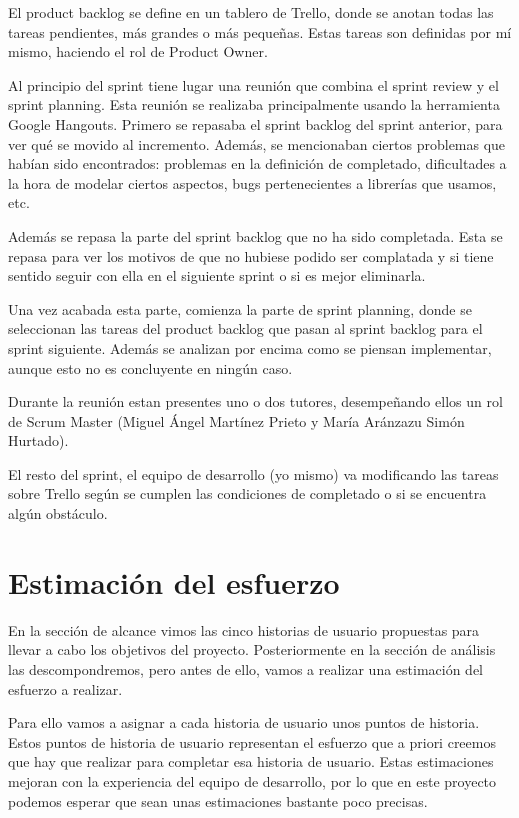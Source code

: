 \documentclass[12pt]{report} %
\begin{document}
El product backlog se define en un tablero de Trello, donde se anotan todas las tareas pendientes, más grandes o más pequeñas. Estas tareas son definidas por mí mismo, haciendo el rol de Product Owner.

Al principio del sprint tiene lugar una reunión que combina el sprint review y el sprint planning. Esta reunión se realizaba principalmente usando la herramienta Google Hangouts. Primero se repasaba el sprint backlog del sprint anterior, para ver qué se movido al incremento. Además, se mencionaban ciertos problemas que habían sido encontrados: problemas en la definición de completado, dificultades a la hora de modelar ciertos aspectos, bugs pertenecientes a librerías que usamos, etc.

Además se repasa la parte del sprint backlog que no ha sido completada. Esta se repasa para ver los motivos de que no hubiese podido ser complatada y si tiene sentido seguir con ella en el siguiente sprint o si es mejor eliminarla.

Una vez acabada esta parte, comienza la parte de sprint planning, donde se seleccionan las tareas del product backlog que pasan al sprint backlog para el sprint siguiente. Además se analizan por encima como se piensan implementar, aunque esto no es concluyente en ningún caso.

Durante la reunión estan presentes uno o dos tutores, desempeñando ellos un rol de Scrum Master (Miguel Ángel Martínez Prieto y María Aránzazu Simón Hurtado).

El resto del sprint, el equipo de desarrollo (yo mismo) va modificando las tareas sobre Trello según se cumplen las condiciones de completado o si se encuentra algún obstáculo.

\section{Estimación del esfuerzo}

En la sección de alcance vimos las cinco historias de usuario propuestas para llevar a cabo los objetivos del proyecto. Posteriormente en la sección de análisis las descompondremos, pero antes de ello, vamos a realizar una estimación del esfuerzo a realizar.

Para ello vamos a asignar a cada historia de usuario unos puntos de historia. Estos puntos de historia de usuario representan el esfuerzo que a priori creemos que hay que realizar para completar esa historia de usuario. Estas estimaciones mejoran con la experiencia del equipo de desarrollo, por lo que en este proyecto podemos esperar que sean unas estimaciones bastante poco precisas. 
\end{document}
